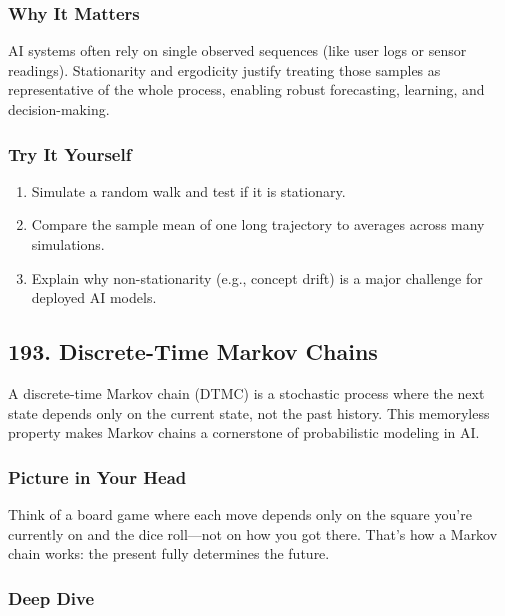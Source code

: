 \documentclass[
  letterpaper,
  DIV=11,
  numbers=noendperiod]{scrreprt}
\providecommand{\tightlist}{%
  \setlength{\itemsep}{0pt}\setlength{\parskip}{0pt}}
\begin{document}
\subsubsection{Why It Matters}\label{why-it-matters-89}

AI systems often rely on single observed sequences (like user logs or
sensor readings). Stationarity and ergodicity justify treating those
samples as representative of the whole process, enabling robust
forecasting, learning, and decision-making.

\subsubsection{Try It Yourself}\label{try-it-yourself-191}

\begin{enumerate}
\def\labelenumi{\arabic{enumi}.}
\tightlist
\item
  Simulate a random walk and test if it is stationary.
\item
  Compare the sample mean of one long trajectory to averages across many
  simulations.
\item
  Explain why non-stationarity (e.g., concept drift) is a major
  challenge for deployed AI models.
\end{enumerate}

\subsection{193. Discrete-Time Markov
Chains}\label{discrete-time-markov-chains}

A discrete-time Markov chain (DTMC) is a stochastic process where the
next state depends only on the current state, not the past history. This
memoryless property makes Markov chains a cornerstone of probabilistic
modeling in AI.

\subsubsection{Picture in Your Head}\label{picture-in-your-head-192}

Think of a board game where each move depends only on the square you're
currently on and the dice roll---not on how you got there. That's how a
Markov chain works: the present fully determines the future.

\subsubsection{Deep Dive}\label{deep-dive-192}
\end{document}
